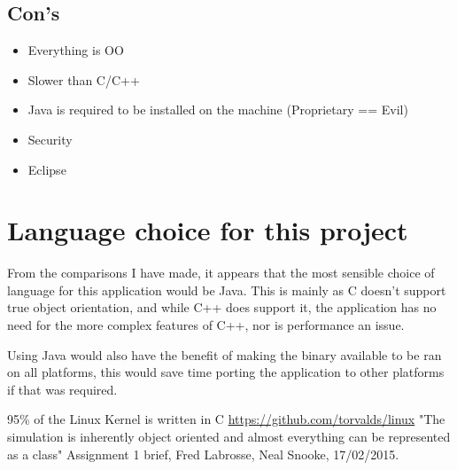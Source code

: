 \documentclass[10pt]{article}
\begin{document}
  \subsection{Con's}
  \begin{itemize}
    \item Everything is OO
    \item Slower than C/C++
    \item Java is required to be installed on the machine (Proprietary == Evil)
    \item Security
    \item Eclipse
  \end{itemize}

  \section{Language choice for this project}
  From the comparisons I have made, it appears that the most sensible choice of language for this application would be Java. This is mainly as C doesn't support true object orientation, and while C++ does support it, the application has no need for the more complex features of C++, nor is performance an issue. 

  Using Java would also have the benefit of making the binary available to be ran on all platforms, this would save time porting the application to other platforms if that was required. 

  
  \begin{thebibliography}{1}
    95\% of the Linux Kernel is written in C \url{https://github.com/torvalds/linux}
    "The simulation is inherently object oriented and almost everything can be represented as a class" Assignment 1 brief, Fred Labrosse, Neal Snooke, 17/02/2015.

  \end{thebibliography}
\end{document}
